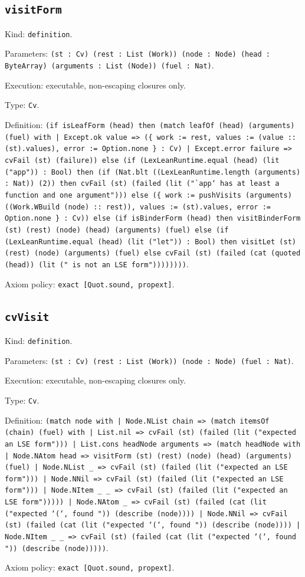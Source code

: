 \documentclass[11pt]{article}
\begin{document}
\subsection*{\texttt{visitForm}}
\noindent Kind: \texttt{definition}.\par
\noindent Parameters: \texttt{(st : Cv) (rest : List (Work)) (node : Node) (head : ByteArray) (arguments : List (Node)) (fuel : Nat)}.\par
\noindent Execution: executable, non-escaping closures only.\par
\noindent Type: \texttt{Cv}.\par
\noindent Definition: \texttt{(if isLeafForm (head) then (match leafOf (head) (arguments) (fuel) with | Except.ok value => (\{ work := rest, values := (value :: (st).values), error := Option.none \} : Cv) | Except.error failure => cvFail (st) (failure)) else (if (LexLeanRuntime.equal (head) (lit ("app")) : Bool) then (if (Nat.blt ((LexLeanRuntime.length (arguments) : Nat)) (2)) then cvFail (st) (failed (lit ("`app` has at least a function and one argument"))) else (\{ work := pushVisits (arguments) ((Work.WBuild (node) :: rest)), values := (st).values, error := Option.none \} : Cv)) else (if isBinderForm (head) then visitBinderForm (st) (rest) (node) (head) (arguments) (fuel) else (if (LexLeanRuntime.equal (head) (lit ("let")) : Bool) then visitLet (st) (rest) (node) (arguments) (fuel) else cvFail (st) (failed (cat (quoted (head)) (lit (" is not an LSE form"))))))))}.\par
\noindent Axiom policy: \texttt{exact [Quot.sound, propext]}.\par
\subsection*{\texttt{cvVisit}}
\noindent Kind: \texttt{definition}.\par
\noindent Parameters: \texttt{(st : Cv) (rest : List (Work)) (node : Node) (fuel : Nat)}.\par
\noindent Execution: executable, non-escaping closures only.\par
\noindent Type: \texttt{Cv}.\par
\noindent Definition: \texttt{(match node with | Node.NList chain => (match itemsOf (chain) (fuel) with | List.nil => cvFail (st) (failed (lit ("expected an LSE form"))) | List.cons headNode arguments => (match headNode with | Node.NAtom head => visitForm (st) (rest) (node) (head) (arguments) (fuel) | Node.NList \_ => cvFail (st) (failed (lit ("expected an LSE form"))) | Node.NNil => cvFail (st) (failed (lit ("expected an LSE form"))) | Node.NItem \_ \_ => cvFail (st) (failed (lit ("expected an LSE form"))))) | Node.NAtom \_ => cvFail (st) (failed (cat (lit ("expected `(`, found ")) (describe (node)))) | Node.NNil => cvFail (st) (failed (cat (lit ("expected `(`, found ")) (describe (node)))) | Node.NItem \_ \_ => cvFail (st) (failed (cat (lit ("expected `(`, found ")) (describe (node)))))}.\par
\noindent Axiom policy: \texttt{exact [Quot.sound, propext]}.\par
\end{document}
